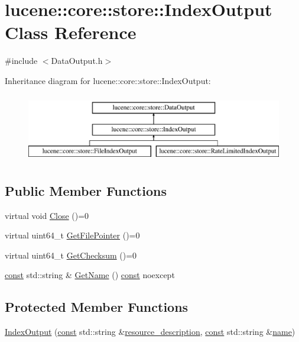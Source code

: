 \hypertarget{classlucene_1_1core_1_1store_1_1IndexOutput}{}\section{lucene\+:\+:core\+:\+:store\+:\+:Index\+Output Class Reference}
\label{classlucene_1_1core_1_1store_1_1IndexOutput}


{\ttfamily \#include $<$Data\+Output.\+h$>$}

Inheritance diagram for lucene\+:\+:core\+:\+:store\+:\+:Index\+Output\+:\begin{figure}[H]
\begin{center}
\leavevmode
\includegraphics[height=3.000000cm]{classlucene_1_1core_1_1store_1_1IndexOutput}
\end{center}
\end{figure}
\subsection*{Public Member Functions}
\begin{DoxyCompactItemize}
\item 
virtual void \mbox{\hyperlink{classlucene_1_1core_1_1store_1_1IndexOutput_a6317af8a5c9359eb687fd182ac3a6ea4}{Close}} ()=0
\item 
virtual uint64\+\_\+t \mbox{\hyperlink{classlucene_1_1core_1_1store_1_1IndexOutput_a79bc74422633022d9ed6d088ad6d4ea2}{Get\+File\+Pointer}} ()=0
\item 
virtual uint64\+\_\+t \mbox{\hyperlink{classlucene_1_1core_1_1store_1_1IndexOutput_aed96af5e2bc906a72b428aa132e5b2a5}{Get\+Checksum}} ()=0
\item 
\mbox{\hyperlink{ZlibCrc32_8h_a2c212835823e3c54a8ab6d95c652660e}{const}} std\+::string \& \mbox{\hyperlink{classlucene_1_1core_1_1store_1_1IndexOutput_a1daa1732a04f8a0fb4c3b37127df3fcf}{Get\+Name}} () \mbox{\hyperlink{ZlibCrc32_8h_a2c212835823e3c54a8ab6d95c652660e}{const}} noexcept
\end{DoxyCompactItemize}
\subsection*{Protected Member Functions}
\begin{DoxyCompactItemize}
\item 
\mbox{\hyperlink{classlucene_1_1core_1_1store_1_1IndexOutput_a2e11e162d0922f41b7943663eaaf6a3e}{Index\+Output}} (\mbox{\hyperlink{ZlibCrc32_8h_a2c212835823e3c54a8ab6d95c652660e}{const}} std\+::string \&\mbox{\hyperlink{classlucene_1_1core_1_1store_1_1IndexOutput_a0e2f8c314606011f681c74811be781aa}{resource\+\_\+description}}, \mbox{\hyperlink{ZlibCrc32_8h_a2c212835823e3c54a8ab6d95c652660e}{const}} std\+::string \&\mbox{\hyperlink{classlucene_1_1core_1_1store_1_1IndexOutput_ab897c3a1151b60666f513e2cb13189d7}{name}})
\end{DoxyCompactItemize}
